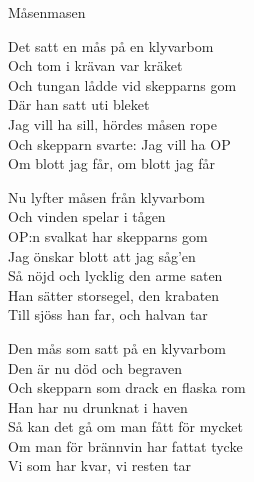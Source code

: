 \begin{song}{Måsen}{masen}
\begin{vers}
Det satt en mås på en klyvarbom\\
Och tom i krävan var kräket\\
Och tungan lådde vid skepparns gom\\
Där han satt uti bleket\\
Jag vill ha sill, hördes måsen rope\\
Och skepparn svarte: Jag vill ha OP\\
Om blott jag får, om blott jag får\\
\end{vers}
\begin{vers}
Nu lyfter måsen från klyvarbom\\
Och vinden spelar i tågen\\
OP:n svalkat har skepparns gom\\
Jag önskar blott att jag såg'en\\
Så nöjd och lycklig den arme saten\\
Han sätter storsegel, den krabaten\\
Till sjöss han far, och halvan tar\\
\end{vers}
\begin{vers}
Den mås som satt på en klyvarbom\\
Den är nu död och begraven\\
Och skepparn som drack en flaska rom\\
Han har nu drunknat i haven\\
Så kan det gå om man fått för mycket\\
Om man för brännvin har fattat tycke\\
Vi som har kvar, vi resten tar\\
\end{vers}
\end{song}
